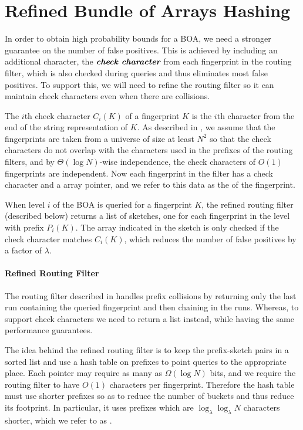 \section{Refined Bundle of Arrays Hashing}\label{sec:boa-refined}

In order to obtain high probability bounds for a BOA, we need a stronger
guarantee on the number of false positives. This is achieved by including an
additional character, the $\emph{\textbf{\boldmath check character}}$ from each fingerprint in the
routing filter, which is also checked during queries and thus eliminates most
false positives.  To support this, we will need to refine the routing filter so
it can maintain check characters even when there are collisions.

The $i$th check character $C_i(K)$ of a fingerprint $K$ is the $i$th character
from the end of the string representation of $K$. As described in
, we assume that the fingerprints are taken from a universe
of size at least $N^2$ so that the check characters do not overlap with the
characters used in the prefixes of the routing filters, and by $\Theta(\log
N)$-wise independence, the check characters of $O(1)$ fingerprints are
independent. Now each fingerprint in the filter has a check character and a
array pointer, and we refer to this data as the  of the
fingerprint.

When level $i$ of the BOA is queried for a fingerprint $K$, the refined routing
filter (described below) returns a list of sketches, one for each fingerprint
in the level with prefix $P_i(K)$. The array indicated in the sketch is only
checked if the check character matches $C_i(K)$, which reduces the number of
false positives by a factor of $\lambda$.

\paragraph{Refined Routing Filter}
The routing filter described in  handles prefix
collisions by returning only the last run containing the queried fingerprint
and then chaining in the runs. Whereas, to support check characters we need to
return a list instead, while having the same performance guarantees.

The idea behind the refined routing filter is to keep the prefix-sketch pairs
in a sorted list and use a hash table on prefixes to point queries to the
appropriate place. Each pointer may require as many as $\Omega(\log N)$ bits,
and we require the routing filter to have $O(1)$ characters per fingerprint.
Therefore the hash table must use shorter prefixes so as to reduce the number
of buckets and thus reduce its footprint. In particular, it uses prefixes which
are $\log_\lambda\log_\lambda N$ characters shorter, which we refer to as
.


